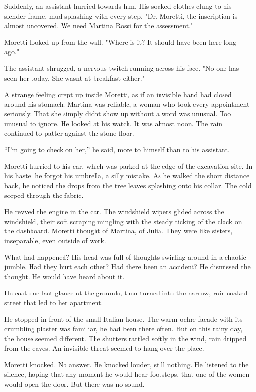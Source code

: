 \documentclass[
]{article}
\begin{document}
Suddenly, an assistant hurried towards him. His soaked clothes clung to his slender frame, mud splashing with every step. "Dr. Moretti, the inscription is almost uncovered. We need Martina Rossi for the assessment."

Moretti looked up from the wall. "Where is it? It should have been here long ago."

The assistant shrugged, a nervous twitch running across his face. "No one has seen her today. She wasn\textquotesingle t at breakfast either."

A strange feeling crept up inside Moretti, as if an invisible hand had closed around his stomach. Martina was reliable, a woman who took every appointment seriously. That she simply didn\textquotesingle t show up without a word was unusual. Too unusual to ignore. He looked at his watch. It was almost noon. The rain continued to patter against the stone floor.

``I'm going to check on her,'' he said, more to himself than to his assistant.

Moretti hurried to his car, which was parked at the edge of the excavation site. In his haste, he forgot his umbrella, a silly mistake. As he walked the short distance back, he noticed the drops from the tree leaves splashing onto his collar. The cold seeped through the fabric.

He revved the engine in the car. The windshield wipers glided across the windshield, their soft scraping mingling with the steady ticking of the clock on the dashboard. Moretti thought of Martina, of Julia. They were like sisters, inseparable, even outside of work.

What had happened? His head was full of thoughts swirling around in a chaotic jumble. Had they hurt each other? Had there been an accident? He dismissed the thought. He would have heard about it.

He cast one last glance at the grounds, then turned into the narrow, rain-soaked street that led to her apartment.

He stopped in front of the small Italian house. The warm ochre facade with its crumbling plaster was familiar, he had been there often. But on this rainy day, the house seemed different. The shutters rattled softly in the wind, rain dripped from the eaves. An invisible threat seemed to hang over the place.

Moretti knocked. No answer. He knocked louder, still nothing. He listened to the silence, hoping that any moment he would hear footsteps, that one of the women would open the door. But there was no sound.
\end{document}
